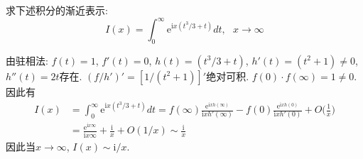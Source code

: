 \begin{problem}[习题2.7]
求下述积分的渐近表示:
\[
I(x) = \int_0^\infty \mathrm{e}^{\mathrm{i} x(t^3/3+t)} dt,\:\:\: x\rightarrow \infty
\]
\end{problem}

\begin{solution}
由驻相法: $f(t)=1$, $f'(t)=0$, $h(t)=(t^{3}/3+t)$, $h'(t)=(t^{2}+1)\neq0$,
$h''(t)=2t$存在. $(f/h')'=[1/(t^{2}+1)]'$绝对可积. $f(0)\cdot f(\infty)=1\neq0$.
因此有
\begin{align*}
I(x) & =\int_{0}^{\infty}\mathrm{e}^{\mathrm{i}x(t^{3}/3+t)}dt=f(\infty)\frac{\mathrm{e}^{\mathrm{i}xh(\infty)}}{\mathrm{i}xh'(\infty)}-f(0)\frac{\mathrm{e}^{\mathrm{i}xh(0)}}{\mathrm{i}xh'(0)}+O\Big(\frac{1}{x}\Big)\\
 & =\frac{\mathrm{e}^{\mathrm{i}x\infty}}{\mathrm{i}x\infty}+\frac{\mathrm{i}}{x}+O(1/x)\sim\frac{\mathrm{i}}{x}
\end{align*}
因此当$x\rightarrow\infty$, $I(x)\sim\mathrm{i}/x$.
\end{solution}
